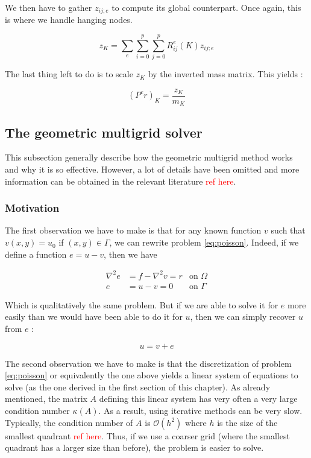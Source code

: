 We then have to gather $z_{ij;e}$ to compute its global counterpart. Once again, this is where we handle hanging nodes.

$$z_{K} = \sum_e\sum_{i=0}^p\sum_{j=0}^p R^e_{ij}(K)z_{ij;e}$$

The last thing left to do is to scale $z_K$ by the inverted mass matrix. This yields : 

$$(P^cr)_K = \frac{z_K}{m_K}$$

\subsection{The geometric multigrid solver}

This subsection generally describe how the geometric multigrid method works and why it is so effective. However, a lot of details have been omitted and more information can be obtained in the relevant literature \textcolor{red}{ref here}.

\subsubsection{Motivation}

The first observation we have to make is that for any known function $v$ such that $v(x,y)=u_0$ if $(x,y) \in \Gamma$, we can rewrite problem \ref{eq:poisson}. Indeed, if we define a function $e = u-v$, then we have

\begin{align}
\nabla ^2 e &= f-\nabla^2v = r &\text{on $\Omega$} \label{eq:poisson_error}\\
e &= u-v = 0 &\text{on $\Gamma$}
\end{align}

Which is qualitatively the same problem. But if we are able to solve it for $e$ more easily than we would have been able to do it for $u$, then we can simply recover $u$ from $e$ : 

$$u = v + e$$

The second observation we have to make is that the discretization of problem \ref{eq:poisson} or equivalently the one above yields a linear system of equations to solve (as the one derived in the first section of this chapter). As already mentioned, the matrix $A$ defining this linear system has very often a very large condition number $\kappa(A)$. As a result, using iterative methods can be very slow. Typically, the condition number of $A$ is $\mathcal{O}(h^2)$ where $h$ is the size of the smallest quadrant \textcolor{red}{ref here}. Thus, if we use a coarser grid (where the smallest quadrant has a larger size than before), the problem is easier to solve. 

